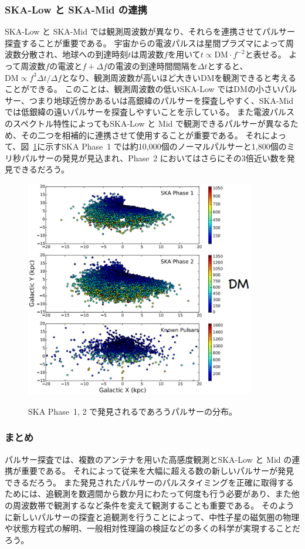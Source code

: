 \subsubsection{SKA-Low と SKA-Mid の連携}
SKA-Low と SKA-Mid では観測周波数が異なり、それらを連携させてパルサー探査することが重要である。
宇宙からの電波パルスは星間プラズマによって周波数分散され、地球への到達時刻$t$は周波数$f$を用いて$t \propto \text{DM}\cdot f^{-2}$と表せる。
よって周波数$f$の電波と$f+\varDelta f$の電波の到達時間間隔を$\varDelta t$とすると、$\text{DM} \propto f^{3} \varDelta t/\varDelta f$となり、観測周波数が高いほど大きいDMを観測できると考えることができる。
このことは、観測周波数の低いSKA-Low ではDMの小さいパルサー、つまり地球近傍かあるいは高銀緯のパルサーを探査しやすく、SKA-Midでは低銀緯の遠いパルサーを探査しやすいことを示している。
また電波パルスのスペクトル特性によってもSKA-Low と Mid で観測できるパルサーが異なるため、その二つを相補的に連携させて使用することが重要である。
それによって、図~\ref{pulsar.keane.fig1}に示すSKA Phase~1 では約10,000個のノーマルパルサーと1,800個のミリ秒パルサーの発見が見込まれ、Phase~2 においてはさらにその3倍近い数を発見できるだろう。
\begin{figure}
	\centering
	\includegraphics[width=10cm]{pulsar/pulsar.keane.fig1.eps}
	\label{pulsar.keane.fig1}
	\caption{SKA Phase~1, 2 で発見されるであろうパルサーの分布。}
\end{figure}

\subsubsection{まとめ}
パルサー探査では、複数のアンテナを用いた高感度観測とSKA-Low と Mid の連携が重要である。
それによって従来を大幅に超える数の新しいパルサーが発見できるだろう。
また発見されたパルサーのパルスタイミングを正確に取得するためには、追観測を数週間から数か月にわたって何度も行う必要があり、また他の周波数帯で観測するなど条件を変えて観測することも重要である。
そのように新しいパルサーの探査と追観測を行うことによって、中性子星の磁気圏の物理や状態方程式の解明、一般相対性理論の検証などの多くの科学が実現することだろう。


